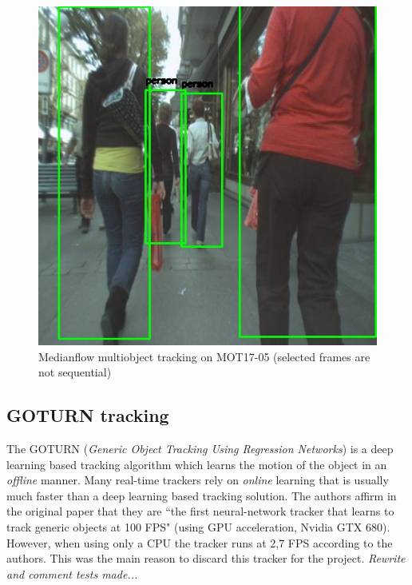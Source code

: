 \begin{figure}[H]
\begin{center}
\includegraphics[scale=0.25]{figures/659.jpg}
\caption{Medianflow multiobject tracking on MOT17-05 (selected frames are not sequential)}
\label{fig:medianflow_images}
\end{center}
\end{figure}
\subsection{GOTURN tracking}
The GOTURN (\textit{Generic Object Tracking Using Regression Networks}) is a deep learning based tracking algorithm which learns the motion of the object in an \textit{offline} manner. Many real-time trackers rely on \textit{online} learning that is usually much faster than a deep learning based tracking solution. The authors affirm in the original paper \cite{held2016learning} that they are ``the first neural-network tracker that learns to track generic objects at 100 FPS" (using GPU acceleration, Nvidia GTX 680). However, when using only a CPU the tracker runs at 2,7 FPS according to the authors. This was the main reason to discard this tracker for the project. \textit{Rewrite and comment tests made...} %
